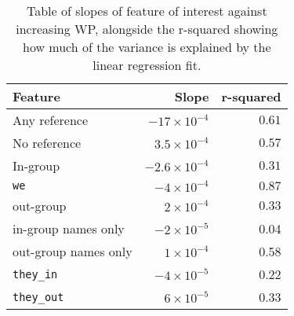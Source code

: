 \begin{table}[t]
    \centering
    \begin{tabular}{lrr}
        \toprule
        \textbf{Feature} & \textbf{Slope} & \textbf{r-squared} \\ \midrule
        Any reference & $-17\times 10^{-4}$ & $0.61$ \\ 
        No reference & $3.5\times 10^{-4}$ & $0.57$ \\
        In-group & $-2.6\times 10^{-4}$ & $0.31$ \\ 
        \texttt{we} & $-4\times 10^{-4}$ & $0.87$ \\  
        out-group & $2\times 10^{-4}$ & $0.33$ \\
        in-group names only & $-2\times 10^{-5}$ & 0.04 \\
        out-group names only & $1\times 10^{-4}$ & 0.58 \\
        \texttt{they\_in} & $-4\times 10^{-5}$ & 0.22 \\
        \texttt{they\_out} & $6\times 10^{-5}$ & 0.33 \\ \bottomrule
    \end{tabular}
    \caption{Table of slopes of feature of interest against increasing WP, alongside the r-squared showing how much of the variance is explained by the linear regression fit.}
    \label{tab:slopes}
\end{table}
